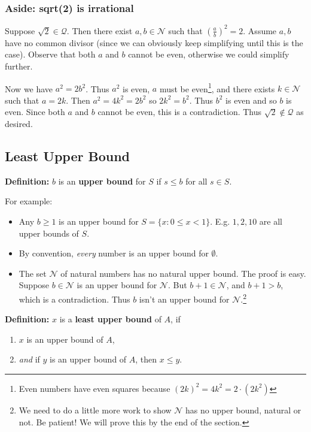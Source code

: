 \subsubsection*{Aside: sqrt(2) is irrational}\label{sqrt2proof}
Suppose $\sqrt{2}\in\mathcal{Q}$. Then there exist $a,b\in\mathcal{N}$ such that
$\left(\frac{a}{b}\right)^{2}=2$. Assume $a, b$ have no common divisor
(since we can obviously keep simplifying until this is the case).
Observe that both $a$ and $b$ cannot be even, otherwise we could
simplify further.

\vs

Now we have $a^{2}=2b^{2}$. Thus $a^{2}$ is even, $a$ must be
even\footnote{Even numbers have even squares because
  ${(2k)}^{2}=4k^{2}=2\cdot(2k^{2})$}, and there exists
$k\in\mathcal{N}$ such that $a=2k$. Then $a^{2}=4k^{2}=2b^{2}$ so
$2k^{2}=b^{2}$. Thus $b^{2}$ is even and so $b$ is even. Since both
$a$ and $b$ cannot be even, this is a contradiction. Thus
$\sqrt{2}\notin\mathcal{Q}$ as desired.

\subsection{Least Upper Bound}
\textbf{Definition:} $b$ is an \textbf{upper bound} for $S$ if
$s\leq b$ for all $s\in S$.

\vs

For example:
\begin{itemize}
\item Any $b\geq1$ is an upper bound for $S=\{x:0\leq x<1\}$. E.g. $1, 2,
  10$ are all upper bounds of $S$.
\item By convention, \textit{every} number is an upper bound for $\emptyset$.
\item The set $\mathcal{N}$ of natural numbers has no natural upper bound. The
  proof is easy. Suppose $b\in\mathcal{N}$ is an upper bound for
  $\mathcal{N}$. But $b+1\in\mathcal{N}$, and $b+1>b$, which is a contradiction. Thus
  $b$ isn't an upper bound for $\mathcal{N}$.\footnote{We need to do a little
    more work to show $\mathcal{N}$ has no upper bound, natural or not. Be
    patient! We will prove this by the end of the section.}
\end{itemize}

\vs

\textbf{Definition:} $x$ is a \textbf{least upper bound} of $A$, if
\begin{enumerate}
\item $x$ is an upper bound of $A$,
\item \textit{and} if $y$ is an upper bound of $A$, then $x\leq y$.
\end{enumerate}

